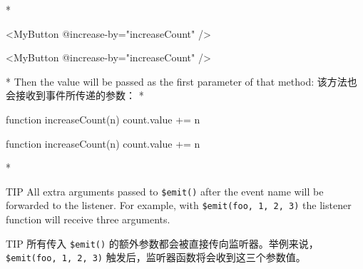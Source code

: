 \begin{paracol}{2}
\switchcolumn[0]*%
\begin{codeHtml}
<MyButton @increase-by="increaseCount" />
\end{codeHtml}
\switchcolumn
\begin{codeHtml}
<MyButton @increase-by="increaseCount" />
\end{codeHtml}
\switchcolumn[0]*%
Then the value will be passed as the first parameter of that method:
\switchcolumn
该方法也会接收到事件所传递的参数：
\switchcolumn[0]*%
\begin{codeJs}
function increaseCount(n) {
  count.value += n
}
\end{codeJs}
\switchcolumn
\begin{codeJs}
function increaseCount(n) {
  count.value += n
}
\end{codeJs}
\switchcolumn[0]*%
\begin{vueQuote}{TIP}
All extra arguments passed to \texttt{\$emit()} after the event name
will be forwarded to the listener. For example, with
\texttt{\$emit(\textquotesingle{}foo\textquotesingle{},\ 1,\ 2,\ 3)} the
listener function will receive three arguments.
\end{vueQuote} 
\switchcolumn
\begin{vueQuote}{TIP}
所有传入 \texttt{\$emit()}
的额外参数都会被直接传向监听器。举例来说，\texttt{\$emit(\textquotesingle{}foo\textquotesingle{},\ 1,\ 2,\ 3)}
触发后，监听器函数将会收到这三个参数值。
\end{vueQuote} 
\end{paracol}

